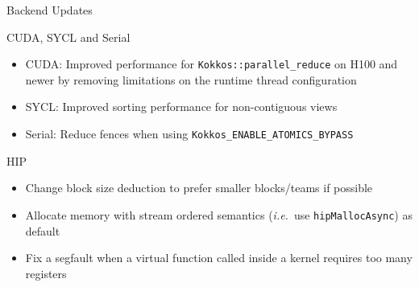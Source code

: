 
\begin{frame}[fragile]

  {\Huge Backend Updates}

  \vspace{10pt}

\end{frame}





\begin{frame}[fragile]{CUDA, SYCL and Serial}
  \begin{itemize}
      \item CUDA: Improved performance for \texttt{Kokkos::parallel\_reduce} on H100 and newer by removing limitations on the runtime thread configuration
      \item SYCL: Improved sorting performance for non-contiguous views
      \item Serial: Reduce fences when using \texttt{Kokkos\_ENABLE\_ATOMICS\_BYPASS}
  \end{itemize}
\end{frame}

\begin{frame}[fragile]{HIP}
  \begin{itemize}
      \item Change block size deduction to prefer smaller blocks/teams if possible
      \item Allocate memory with stream ordered semantics (\emph{i.e.}\ use \texttt{hipMallocAsync}) as default
      \item Fix a segfault when a virtual function called inside a kernel requires too many registers
  \end{itemize}
\end{frame}




